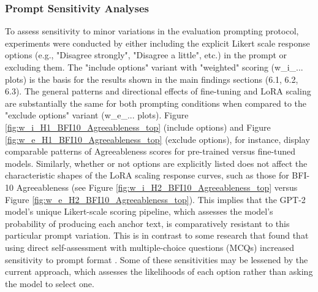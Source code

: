 \documentclass{DESSThesis}
\begin{document}
\subsubsection{Prompt Sensitivity Analyses}
To assess sensitivity to minor variations in the evaluation prompting protocol, experiments were conducted by either including the explicit Likert scale response options (e.g., "Disagree strongly", "Disagree a little", etc.) in the prompt or excluding them. The "include options" variant with "weighted" scoring (w\_i\_... plots) is the basis for the results shown in the main findings sections (6.1, 6.2, 6.3). The general patterns and directional effects of fine-tuning and LoRA scaling are substantially the same for both prompting conditions when compared to the "exclude options" variant (w\_e\_... plots). Figure \ref{fig:w_i_H1_BFI10_Agreeableness_top} (include options) and Figure \ref{fig:w_e_H1_BFI10_Agreeableness_top} (exclude options), for instance, display comparable patterns of Agreeableness scores for pre-trained versus fine-tuned models. Similarly, whether or not options are explicitly listed does not affect the characteristic shapes of the LoRA scaling response curves, such as those for BFI-10 Agreeableness (see Figure \ref{fig:w_i_H2_BFI10_Agreeableness_top} versus Figure \ref{fig:w_e_H2_BFI10_Agreeableness_top}). This implies that the GPT-2 model's unique Likert-scale scoring pipeline, which assesses the model's probability of producing each anchor text, is comparatively resistant to this particular prompt variation. This is in contrast to some research that found that using direct self-assessment with multiple-choice questions (MCQs) increased sensitivity to prompt format \cite{gupta_self-assessment_2024, shu_you_2024}. Some of these sensitivities may be lessened by the current approach, which assesses the likelihoods of each option rather than asking the model to select one.
\\
\end{document}
